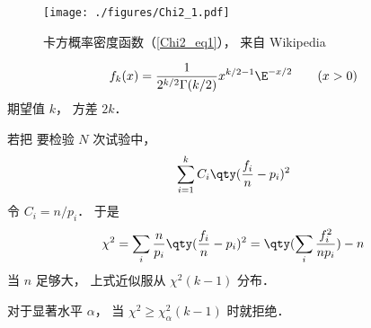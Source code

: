
\begin{issues}
\issueDraft
\end{issues}

\begin{figure}[ht]
\centering
\texttt{[image: ./figures/Chi2\_1.pdf]}
\caption{卡方概率密度函数（\autoref{Chi2_eq1}）， 来自 Wikipedia} \label{Chi2_fig1}
\end{figure}

\begin{equation}\label{Chi2_eq1}
f_k(x) = \frac{1}{2^{k/2}\Gamma(k/2)}x^{k/2-1}\E^{-x/2} \qquad (x > 0)
\end{equation}
期望值 $k$， 方差 $2k$．


若把 要检验 $N$ 次试验中， 
\begin{equation}
\sum_{i=1}^k C_i \qty(\frac{f_i}{n} - p_i)^2
\end{equation}
令 $C_i = n/p_i$． 于是
\begin{equation}
\chi^2 = \sum_i \frac{n}{p_i} \qty(\frac{f_i}{n} - p_i)^2 = \qty(\sum_i \frac{f_i^2}{np_i}) - n
\end{equation}
当 $n$ 足够大， 上式近似服从 $\chi^2(k-1)$ 分布．

对于显著水平 $\alpha$， 当 $\chi^2 \geqslant \chi_\alpha^2(k-1)$ 时就拒绝．

